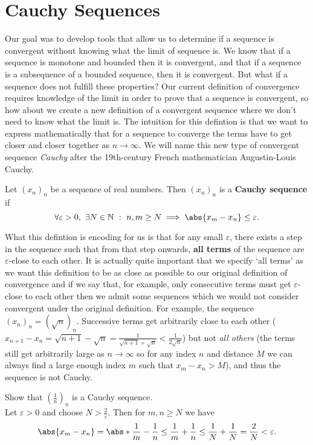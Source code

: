 \documentclass[../real_analysis.tex]{subfiles}
\begin{document}
    \section{Cauchy Sequences}
        Our goal was to develop tools that allow us to determine if a sequence is convergent without knowing what the limit of sequence is. We know that if a sequence is monotone and bounded then it is convergent, and that if a sequence is  a subsequence of a bounded sequence, then it is convergent. But what if a sequence does not fulfill these properties? Our current definition of convergence requires knowledge of the limit in order to prove that a sequence is convergent, so how about we create a new definition of a convergent sequence where we don't need to know what the limit is. The intuition for this defintion is that we want to express mathematically that for a sequence to converge the terms have to get closer and closer together as $n\to\infty$. We will name this new type of convergent sequence \textit{Cauchy} after the 19th-century French mathematician Augustin-Louis Cauchy.
        \begin{definition}
            Let $(x_n)_n$ be a sequence of real numbers. Then $(x_n)_n$ is a \textbf{Cauchy sequence} if
            \begin{equation}
                \forall\varepsilon>0,\ \exists N\in\mathbb{N}\ :\ n,m\geq N\implies\abs{x_m-x_n}\leq\varepsilon.
            \end{equation}
        \end{definition}
        What this defintion is encoding for us is that for any small $\varepsilon$, there exists a step in the sequence such that from that step onwards, \textbf{all terms} of the sequence are $\varepsilon$-close to each other. It is actually quite important that we specify `all terms' as we want this definition to be as close as possible to our original definition of convergence and if we say that, for example, only consecutive terms must get $\varepsilon$-close to each other then we admit some sequences which we would not consider convergent under the original definition. For example, the sequence $(x_n)_n=(\sqrt{n})_n$. Successive terms get arbitrarily close to each other ($x_{n+1}-x_n=\sqrt{n+1}-\sqrt{n}=\frac{1}{\sqrt{n+1}+\sqrt{n}}<\frac{1}{2\sqrt{n}}$) but not \textit{all others} (the terms still get arbitrarily large as $n\to\infty$ so for any index $n$ and distance $M$ we can always find a large enough index $m$ such that $x_m-x_n>M$), and thus the sequence is not Cauchy.
        \begin{example}
            Show that $\left(\frac{1}{n}\right)_n$ is a Cauchy sequence.\\
            Let $\varepsilon>0$ and choose $N>\frac{2}{\varepsilon}$. Then for $m,n\geq N$ we have
            \begin{equation}
                \abs{x_m-x_n}=\abs*{\frac{1}{m}-\frac{1}{n}}\leq\frac{1}{m}+\frac{1}{n}\leq\frac{1}{N}+\frac{1}{N}=\frac{2}{N}<\varepsilon.
            \end{equation}
        \end{example}
\end{document}
